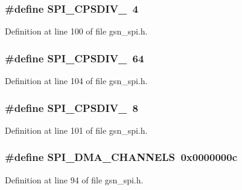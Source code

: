 \hypertarget{a00587_a188625c01c63c22c4da5761f1bc2aa9d}{
\subsubsection[{SPI\_\-CPSDIV\_\-4}]{\setlength{\rightskip}{0pt plus 5cm}\#define SPI\_\-CPSDIV\_~4}}
\label{a00587_a188625c01c63c22c4da5761f1bc2aa9d}


Definition at line 100 of file gsn\_\-spi.h.

\hypertarget{a00587_ad50de377e5c2b1f24f383658becb263f}{
\subsubsection[{SPI\_\-CPSDIV\_\-64}]{\setlength{\rightskip}{0pt plus 5cm}\#define SPI\_\-CPSDIV\_~64}}
\label{a00587_ad50de377e5c2b1f24f383658becb263f}


Definition at line 104 of file gsn\_\-spi.h.

\hypertarget{a00587_aed030fb6acbafc2b27a6f43d1af24924}{
\subsubsection[{SPI\_\-CPSDIV\_\-8}]{\setlength{\rightskip}{0pt plus 5cm}\#define SPI\_\-CPSDIV\_~8}}
\label{a00587_aed030fb6acbafc2b27a6f43d1af24924}


Definition at line 101 of file gsn\_\-spi.h.

\hypertarget{a00587_acc862b4e66ca1cd03299556793dc5be3}{
\subsubsection[{SPI\_\-DMA\_\-CHANNELS}]{\setlength{\rightskip}{0pt plus 5cm}\#define SPI\_\-DMA\_\-CHANNELS~0x0000000c}}
\label{a00587_acc862b4e66ca1cd03299556793dc5be3}


Definition at line 94 of file gsn\_\-spi.h.

